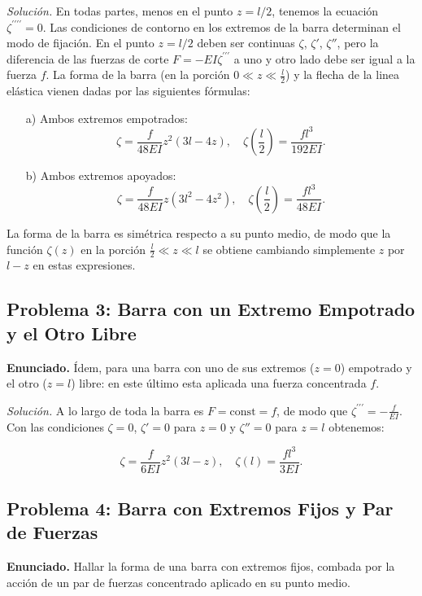 \documentclass{article}
\begin{document}
\textit{Solución.} En todas partes, menos en el punto $z = l/2$, tenemos la ecuación $\zeta^{\prime\prime\prime\prime} = 0$. Las condiciones de contorno en los extremos de la barra determinan el modo de fijación. En el punto $z = l/2$ deben ser continuas $\zeta$, $\zeta'$, $\zeta''$, pero la diferencia de las fuerzas de corte $F=-EI\zeta^{\prime\prime\prime}$ a uno y otro lado debe ser igual a la fuerza $f$.
La forma de la barra (en la porción $0\ll z\ll \frac{l}{2}$) y la flecha de la linea elástica vienen dadas por las siguientes fórmulas:

\begin{enumerate}
    \item[a)] Ambos extremos empotrados:
    $$
    \zeta = \frac{f}{48EI} z^2(3l - 4z), \quad \zeta\left(\frac{l}{2}\right) = \frac{fl^3}{192EI}.
    $$

    \item[b)] Ambos extremos apoyados:
    $$
    \zeta = \frac{f}{48EI} z(3l^2 - 4z^2), \quad \zeta\left(\frac{l}{2}\right) = \frac{fl^3}{48EI}.
    $$
\end{enumerate}

La forma de la barra es simétrica respecto a su punto medio, de modo que la función $\zeta (z)$ en la porción $\frac{l}{2}\ll z\ll l$ se obtiene cambiando simplemente $z$ por $l-z$ en estas expresiones.

\subsection*{Problema 3: Barra con un Extremo Empotrado y el Otro Libre}
\textbf{Enunciado.} Ídem, para una barra con uno de sus extremos ($z=0$) empotrado y el otro ($z=l$) libre: en este último esta aplicada una fuerza concentrada $f$.

\textit{Solución.} A lo largo de toda la barra es $F = \text{const} = f$, de modo que $\zeta^{\prime\prime\prime} = -\frac{f}{EI}$. Con las condiciones $\zeta = 0$, $\zeta' = 0$ para $z = 0$ y $\zeta'' = 0$ para $z = l$ obtenemos:

$$
\zeta = \frac{f}{6EI} z^2(3l - z), \quad \zeta(l) = \frac{fl^3}{3EI}.
$$

\subsection*{Problema 4: Barra con Extremos Fijos y Par de Fuerzas}
\textbf{Enunciado.} Hallar la forma de una barra con extremos fijos, combada por la acción de un par de fuerzas concentrado aplicado en su punto medio.
\end{document}
